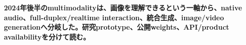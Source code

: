 \noindent\textbf{2024年後半のmultimodalityは、画像を理解できるという一軸から、native audio、full-duplex/realtime interaction、統合生成、image/video generationへ分岐した。研究prototype、公開weights、API/product availabilityを分けて読む。}\autocite{src-4a870e1e2c95,src-c5ed64e39d0c,src-f6c8da8253fb}
